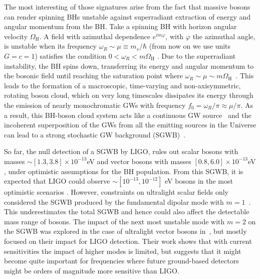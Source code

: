 \documentclass[
reprint,           %
superscriptaddress,%
amsmath,           %
amssymb,           %
aps,               %
prd,               %
notitlepage,       %
floatfix,          %
nofootinbib %
]{revtex4-1}
\begin{document}
The most interesting of those signatures arise from the fact that massive bosons can render spinning BHs unstable against superradiant extraction of energy and angular momentum from the BH.
Take a spinning BH with horizon angular velocity $\Omega_{\mathrm{H}}$. A field with azimuthal dependence $e^{im\varphi}$, with $\varphi$ the azimuthal angle, is unstable when its frequency $\omega_R\sim \mu  \equiv m_s/\hbar$ (from now on we use units $G=c=1$) satisfies the condition $0<\omega_R<m\Omega_{\mathrm{H}}$ \cite{Press:1972zz,Detweiler:1980uk,Cardoso:2004nk,Dolan:2007mj,Brito:2015oca}. 
%
Due to the superradiant instability, the BH spins down, transferring its energy and angular momentum to the bosonic field until reaching the saturation point where $\omega_{R}\sim \mu \sim m\Omega_{\mathrm{H}}$~\cite{Brito:2014wla,East:2017mrj,East:2018glu}. This leads to the formation of a macroscopic, time-varying and non-axisymmetric, rotating boson cloud, which on very long timescales dissipates its energy through the emission of nearly monochromatic GWs with frequency $f_0=\omega_R/\pi\approx \mu/\pi$. As a result, this BH-boson cloud system acts like a continuous GW source~\cite{Arvanitaki:2014wva,Arvanitaki:2016qwi,Baryakhtar:2017ngi,Brito:2017wnc,Brito:2017zvb,Isi:2018pzk,Ghosh:2018gaw,Palomba:2019vxe,Sun:2019mqb,Zhu:2020tht,Brito:2020lup,Ng:2020jqd} and the incoherent superposition of the GWs from all the emitting sources in the Universe can lead to a strong stochastic GW background (SGWB)~\cite{Brito:2017wnc,Brito:2017zvb,Tsukada:2018mbp,Zhu:2020tht,Tsukada:2020lgt}. 


So far, the null detection of a SGWB by LIGO, rules out scalar bosons with masses $\sim [1.3,3.8]\times10^{-13}$eV \cite{Tsukada:2018mbp} and vector bosons with masses $[0.8,6.0]\times10^{-13}$eV \cite{Tsukada:2020lgt}, under optimistic assumptions for the BH population. From this SGWB, it is expected that LIGO could observe $\sim[10^{-13},10^{-12}]$ eV bosons in the most optimistic scenarios \cite{Brito:2017wnc,Brito:2017zvb,Tsukada:2018mbp}. However, constraints on ultralight scalar fields only considered the SGWB produced by the fundamental dipolar mode with $m=1$~\cite{Tsukada:2018mbp}. This underestimates the total SGWB and hence could also affect the detectable mass range of bosons. The impact of the next most unstable mode with $m=2$ on the SGWB was explored in the case of ultralight vector bosons in~\cite{Tsukada:2020lgt}, but mostly focused on their impact for LIGO detection. Their work shows that with current sensitivities the impact of higher modes is limited, but suggests that it might become quite important for frequencies where future ground-based detectors might be orders of magnitude more sensitive than LIGO.
\end{document}
